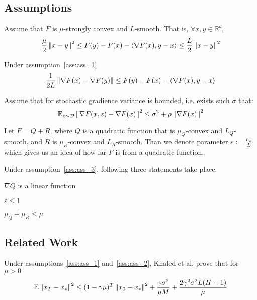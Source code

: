 \subsection{Assumptions}
\begin{assumption} \label{ass:ass_1}
    Assume that $F$ is $\mu$-strongly convex and $L$-smooth. That is, $\forall x, y \in \mathbb{R}^d$,
    \[
    \frac{\mu}{2} \left\|x - y\right\|^2 \leq F(y) - F(x) - \langle \nabla F(x), y-x\rangle \leq \frac{L}{2} \left\|x-y\right\|^2
    \]
\end{assumption}

\begin{corollary} Under assumption~\ref{ass:ass_1}
    \[
    \frac{1}{2L} \left\|\nabla F(x) - \nabla F(y)\right\| \leq F(y) - F(x) - \langle \nabla F(x), y-x\rangle
    \]
\end{corollary}

\begin{assumption} \label{ass:ass_2}
    Assume that for stochastic gradience variance is bounded, i.e. exists such $\sigma$ that:
    \[\mathbb{E}_{z \sim \mathcal{D}} \left\|\nabla F(x, z) - \nabla F(x)\right\|^2 \leq \sigma^2
    + \rho \left\|\nabla F(x)\right\|^2 \]
\end{assumption}

\begin{assumption} \label{ass:ass_3}
    Let $F = Q + R$, where $Q$ is a quadratic function that is $\mu_Q$-convex and $L_Q$-smooth, and $R$ is $\mu_R$-convex and $L_R$-smooth. Than we denote parameter
    \(\varepsilon := \frac{L_R}{L}\)
    which gives us an idea of how far $F$ is from a quadratic function.
\end{assumption}

Under assumption~\ref{ass:ass_3}, following three statements take place:
\begin{corollary} \label{cor:linearity}
    $\nabla Q$ is a linear function
\end{corollary}

\begin{corollary}
    \(\varepsilon \leq 1\)
\end{corollary}

\begin{corollary}
    \(\mu_Q + \mu_R \leq \mu\)
\end{corollary}



\subsection{Related Work}
Under assumptions~\ref{ass:ass_1} and~\ref{ass:ass_2}, Khaled et al. \cite{Khaled} prove that for $\mu > 0$
\begin{equation}
\mathbb{E} \left\|\bar{x}_T - x_*\right\|^2
\leq
(1 - \gamma \mu)^T \left\|x_0 - x_*\right\|^2 
+ \frac{\gamma \sigma^2}{\mu M} 
+ \frac{2 \gamma^2 \sigma^2 L (H-1)}{\mu}
\end{equation}

